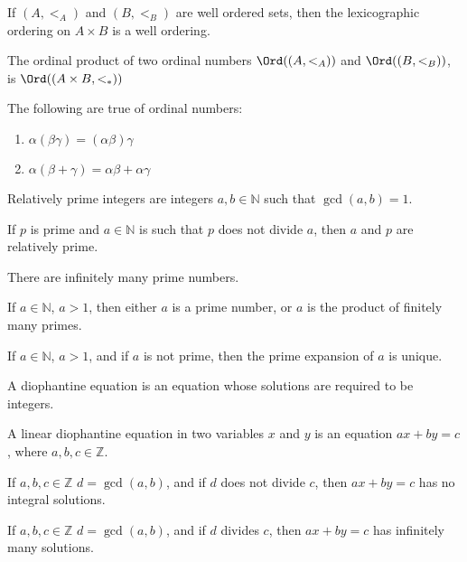         \begin{theorem}
            If $(A,<_{A})$ and $(B,<_{B})$ are well ordered sets, then the
            lexicographic ordering on ${A}\times{B}$ is a well ordering.
        \end{theorem}
        \begin{definition}
            The ordinal product of two ordinal numbers
            $\Ord((A,<_{A}))$ and $\Ord((B,<_{B}))$,
            is $\Ord(({A}\times{B},<_{*}))$
        \end{definition}
        \begin{theorem}
            The following are true of ordinal numbers:
            \begin{enumerate}
                \item $\alpha(\beta\gamma)=(\alpha\beta)\gamma$
                \item $\alpha(\beta+\gamma)=\alpha\beta+\alpha\gamma$
            \end{enumerate}
        \end{theorem}
        \begin{definition}
           Relatively prime integers are integers
           $a,b\in\mathbb{N}$ such that $\gcd(a,b)=1$.
        \end{definition}
        \begin{theorem}
           If $p$ is prime and $a\in\mathbb{N}$ is
           such that $p$ does not divide $a$, then $a$ and $p$
           are relatively prime.
        \end{theorem}
        \begin{theorem}
           There are infinitely many prime numbers.
        \end{theorem}
        \begin{theorem}
           If $a\in\mathbb{N}$, $a>1$, then either
           $a$ is a prime number, or $a$ is the product
           of finitely many primes.
        \end{theorem}
        \begin{theorem}
           If $a\in\mathbb{N}$, $a>1$, and if $a$ is not
           prime, then the prime expansion of $a$ is
           unique.
        \end{theorem}
        \begin{definition}
           A diophantine equation is an equation whose
           solutions are required to be integers.
        \end{definition}
        \begin{definition}
           A linear diophantine equation in two variables
           $x$ and $y$ is an equation
           $ax+by=c$, where $a,b,c\in\mathbb{Z}$.
        \end{definition}
        \begin{theorem}
           If $a,b,c\in\mathbb{Z}$ $d=\gcd(a,b)$, and if $d$ does not
           divide $c$, then $ax+by=c$ has no integral solutions.
        \end{theorem}
        \begin{theorem}
           If $a,b,c\in\mathbb{Z}$ $d=\gcd(a,b)$, and if $d$ divides $c$,
           then $ax+by=c$ has infinitely many solutions.
        \end{theorem}